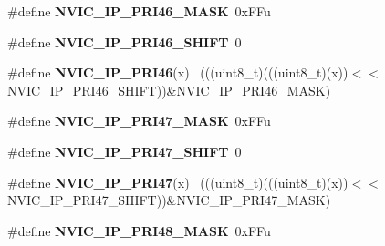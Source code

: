 \begin{DoxyCompactItemize}
\item 
\hypertarget{group___n_v_i_c___register___masks_gad588fc492c122a1939ae27479dba9744}{}\#define {\bfseries N\+V\+I\+C\+\_\+\+I\+P\+\_\+\+P\+R\+I46\+\_\+\+M\+A\+S\+K}~0x\+F\+Fu\label{group___n_v_i_c___register___masks_gad588fc492c122a1939ae27479dba9744}

\item 
\hypertarget{group___n_v_i_c___register___masks_gab9e40e9d99ee9c614693eac734eea7df}{}\#define {\bfseries N\+V\+I\+C\+\_\+\+I\+P\+\_\+\+P\+R\+I46\+\_\+\+S\+H\+I\+F\+T}~0\label{group___n_v_i_c___register___masks_gab9e40e9d99ee9c614693eac734eea7df}

\item 
\hypertarget{group___n_v_i_c___register___masks_ga099cf2b28cdd50e481c6502cc9cacc10}{}\#define {\bfseries N\+V\+I\+C\+\_\+\+I\+P\+\_\+\+P\+R\+I46}(x)                                              ~(((uint8\+\_\+t)(((uint8\+\_\+t)(x))$<$$<$N\+V\+I\+C\+\_\+\+I\+P\+\_\+\+P\+R\+I46\+\_\+\+S\+H\+I\+F\+T))\&N\+V\+I\+C\+\_\+\+I\+P\+\_\+\+P\+R\+I46\+\_\+\+M\+A\+S\+K)\label{group___n_v_i_c___register___masks_ga099cf2b28cdd50e481c6502cc9cacc10}

\item 
\hypertarget{group___n_v_i_c___register___masks_ga2e06766178b4030d2745c29f003e5714}{}\#define {\bfseries N\+V\+I\+C\+\_\+\+I\+P\+\_\+\+P\+R\+I47\+\_\+\+M\+A\+S\+K}~0x\+F\+Fu\label{group___n_v_i_c___register___masks_ga2e06766178b4030d2745c29f003e5714}

\item 
\hypertarget{group___n_v_i_c___register___masks_gaf3e703482ca769c6cb37305245e6ed68}{}\#define {\bfseries N\+V\+I\+C\+\_\+\+I\+P\+\_\+\+P\+R\+I47\+\_\+\+S\+H\+I\+F\+T}~0\label{group___n_v_i_c___register___masks_gaf3e703482ca769c6cb37305245e6ed68}

\item 
\hypertarget{group___n_v_i_c___register___masks_gaa3da5634df694a2e36e108ef1584d6bb}{}\#define {\bfseries N\+V\+I\+C\+\_\+\+I\+P\+\_\+\+P\+R\+I47}(x)                                              ~(((uint8\+\_\+t)(((uint8\+\_\+t)(x))$<$$<$N\+V\+I\+C\+\_\+\+I\+P\+\_\+\+P\+R\+I47\+\_\+\+S\+H\+I\+F\+T))\&N\+V\+I\+C\+\_\+\+I\+P\+\_\+\+P\+R\+I47\+\_\+\+M\+A\+S\+K)\label{group___n_v_i_c___register___masks_gaa3da5634df694a2e36e108ef1584d6bb}

\item 
\hypertarget{group___n_v_i_c___register___masks_ga0c6bb320041e3fdfc12fb0cb2a1c3f24}{}\#define {\bfseries N\+V\+I\+C\+\_\+\+I\+P\+\_\+\+P\+R\+I48\+\_\+\+M\+A\+S\+K}~0x\+F\+Fu\label{group___n_v_i_c___register___masks_ga0c6bb320041e3fdfc12fb0cb2a1c3f24}


\end{DoxyCompactItemize}
